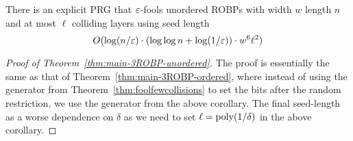 \begin{corollary}\label{cor:CHHL}
There is an explicit PRG that $\varepsilon$-fools unordered ROBPs with width $w$ length $n$ and at most $\ell$ colliding layers using seed length
$$O(\log(n/\varepsilon) \cdot (\log \log n + \log(1/\varepsilon)) \cdot w^6 \ell^2 )$$
\end{corollary}

\begin{proof}[Proof of Theorem~\ref{thm:main-3ROBP-unordered}]
The proof is essentially the same as that of Theorem~\ref{thm:main-3ROBP-ordered}, where instead of using the generator from Theorem~\ref{thm:foolfewcollisions} to set the bits after the random restriction, we use the generator from the above corollary. The final seed-length as a worse dependence on $\delta$ as we need to set $\ell = {\mathrm{poly}}(1/\delta)$ in the above corollary. 
\end{proof}




%


